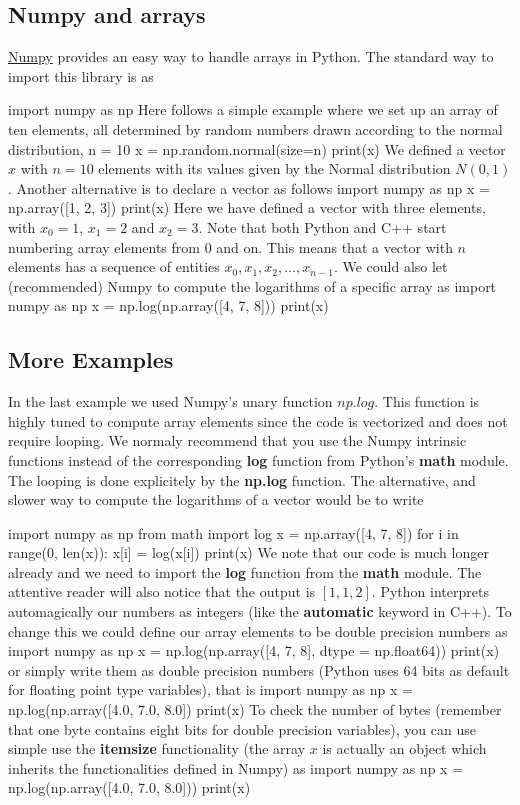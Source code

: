 \documentclass[%
oneside,                 %
final,                   %
10pt]{article}
\begin{document}
\noindent



\subsection{Numpy and arrays}
\href{{http://www.numpy.org/}}{Numpy} provides an easy way to handle arrays in Python. The standard way to import this library is as

\bpycod
import numpy as np
\epycod
Here follows a simple example where we set up an array of ten elements, all determined by random numbers drawn according to the normal distribution,
\bpycod
n = 10
x = np.random.normal(size=n)
print(x)
\epycod
We defined a vector $x$ with $n=10$ elements with its values given by the Normal distribution $N(0,1)$.
Another alternative is to declare a vector as follows
\bpycod
import numpy as np
x = np.array([1, 2, 3])
print(x)
\epycod
Here we have defined a vector with three elements, with $x_0=1$, $x_1=2$ and $x_2=3$. Note that both Python and C++
start numbering array elements from $0$ and on. This means that a vector with $n$ elements has a sequence of entities $x_0, x_1, x_2, \dots, x_{n-1}$. We could also let (recommended) Numpy to compute the logarithms of a specific array as
\bpycod
import numpy as np
x = np.log(np.array([4, 7, 8]))
print(x)
\epycod

\subsection{More Examples}

In the last example we used Numpy's unary function $np.log$. This function is
highly tuned to compute array elements since the code is vectorized
and does not require looping. We normaly recommend that you use the
Numpy intrinsic functions instead of the corresponding \textbf{log} function
from Python's \textbf{math} module. The looping is done explicitely by the
\textbf{np.log} function. The alternative, and slower way to compute the
logarithms of a vector would be to write

\bpycod
import numpy as np
from math import log
x = np.array([4, 7, 8])
for i in range(0, len(x)):
    x[i] = log(x[i])
print(x)
\epycod
We note that our code is much longer already and we need to import the \textbf{log} function from the \textbf{math} module. 
The attentive reader will also notice that the output is $[1, 1, 2]$. Python interprets automagically our numbers as integers (like the \textbf{automatic} keyword in C++). To change this we could define our array elements to be double precision numbers as
\bpycod
import numpy as np
x = np.log(np.array([4, 7, 8], dtype = np.float64))
print(x)
\epycod
or simply write them as double precision numbers (Python uses 64 bits as default for floating point type variables), that is
\bpycod
import numpy as np
x = np.log(np.array([4.0, 7.0, 8.0])
print(x)
\epycod
To check the number of bytes (remember that one byte contains eight bits for double precision variables), you can use simple use the \textbf{itemsize} functionality (the array $x$ is actually an object which inherits the functionalities defined in Numpy) as 
\bpycod
import numpy as np
x = np.log(np.array([4.0, 7.0, 8.0]))
print(x)
\epycod
\end{document}
